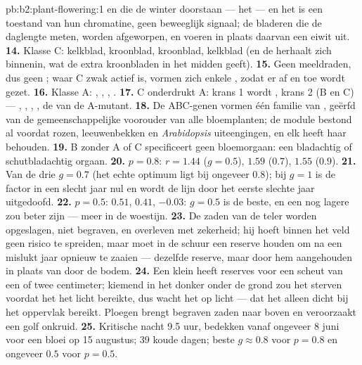 \begin{solution}{pb:b2:plant-flowering:1}
en die de winter doorstaan --- het  --- en het is een toestand van
hun chromatine, geen beweeglijk signaal; de bladeren die de daglengte meten,
worden afgeworpen, en voeren in plaats daarvan een eiwit uit.
\textbf{14.} Klasse C: kelkblad, kroonblad, kroonblad, kelkblad (en de 
herhaalt zich binnenin, wat de extra kroonbladen in het midden geeft).
\textbf{15.} Geen meeldraden, dus geen ; waar C zwak actief is,
vormen zich enkele , zodat er af en toe  wordt gezet.
\textbf{16.} Klasse A: , , , .
\textbf{17.} C onderdrukt A: krans 1 wordt , krans 2 (B en C)
 --- , , , , de  van de
A-mutant.
\textbf{18.} De ABC-genen vormen één familie van ,
geërfd van de gemeenschappelijke voorouder van alle bloemplanten; de module
bestond al voordat rozen, leeuwenbekken en \emph{Arabidopsis} uiteengingen,
en elk heeft haar behouden.
\textbf{19.} B zonder A of C specificeert geen bloemorgaan: een bladachtig
of schutbladachtig orgaan.
\textbf{20.} $p = 0.8$: $r = 1.44$ ($g = 0.5$), $1.59$ ($0.7$), $1.55$
($0.9$).
\textbf{21.} Van de drie $g = 0.7$ (het echte optimum ligt bij ongeveer
$0.8$); bij $g = 1$ is de factor in een slecht jaar nul en wordt de lijn
door het eerste slechte jaar uitgedoofd.
\textbf{22.} $p = 0.5$: $0.51$, $0.41$, $-0.03$: $g = 0.5$ is de beste,
en een nog lagere zou beter zijn --- meer  in de woestijn.
\textbf{23.} De zaden van de teler worden opgeslagen, niet begraven, en
overleven met zekerheid; hij hoeft binnen het veld geen risico te spreiden,
maar moet in de schuur een reserve houden om na een mislukt jaar opnieuw te
zaaien --- dezelfde reserve, maar door hem aangehouden in plaats van door de
bodem.
\textbf{24.} Een klein  heeft reserves voor een scheut van een of twee
centimeter; kiemend in het donker onder de grond zou het sterven voordat het
het licht bereikte, dus wacht het op licht --- dat het alleen dicht bij het
oppervlak bereikt. Ploegen brengt begraven zaden naar boven en veroorzaakt
een golf onkruid.
\textbf{25.} Kritische nacht 9.5 uur, bedekken vanaf ongeveer 8 juni voor
een bloei op 15 augustus; 39 koude dagen; beste $g \approx 0.8$ voor
$p = 0.8$ en ongeveer $0.5$ voor $p = 0.5$.
\end{solution}

